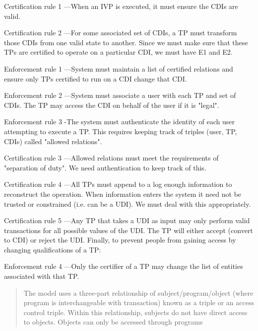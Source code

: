 \documentclass[Screen16to9,17pt]{foils}
\begin{document}


\begin{list22}
\item[Certification rule 1] —When an IVP is executed, it must ensure the CDIs are valid.
\item[Certification rule 2] —For some associated set of CDIs, a TP must transform those CDIs from one valid state to another.
Since we must make sure that these TPs are certified to operate on a particular CDI, we must have E1 and E2.

\item[Enforcement rule 1] —System must maintain a list of certified relations and ensure only TPs certified to run on a CDI change that CDI.
\item[Enforcement rule 2] —System must associate a user with each TP and set of CDIs. The TP may access the CDI on behalf of the user if it is "legal".
\item[Enforcement rule 3] -The system must authenticate the identity of each user attempting to execute a TP.
This requires keeping track of triples (user, TP, {CDIs}) called "allowed relations".

\item[Certification rule 3] —Allowed relations must meet the requirements of "separation of duty".
We need authentication to keep track of this.

\item[Certification rule 4] —All TPs must append to a log enough information to reconstruct the operation.
When information enters the system it need not be trusted or constrained (i.e. can be a UDI). We must deal with this appropriately.

\item[Certification rule 5] —Any TP that takes a UDI as input may only perform valid transactions for all possible values of the UDI. The TP will either accept (convert to CDI) or reject the UDI.
Finally, to prevent people from gaining access by changing qualifications of a TP:

\item[Enforcement rule 4] —Only the certifier of a TP may change the list of entities associated with that TP.
\end{list22}



\begin{quote}
The model uses a three-part relationship of subject/program/object (where program is interchangeable with transaction) known as a triple or an access control triple. Within this relationship, subjects do not have direct access to objects. Objects can only be accessed through programs
\end{quote}
\end{document}
